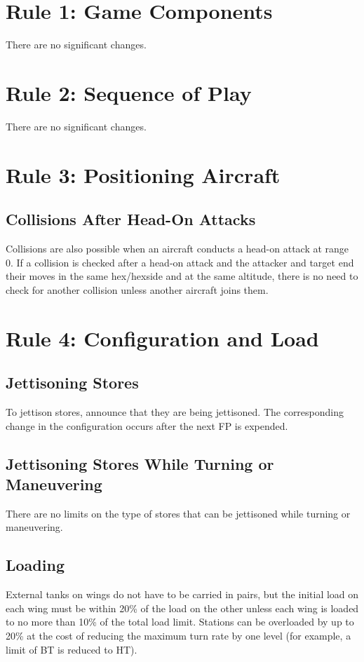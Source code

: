 \documentclass[10pt]{extarticle}
\begin{document}
\section{Rule 1: Game Components}

There are no significant changes.

\section{Rule 2: Sequence of Play}

There are no significant changes.

\section{Rule 3: Positioning Aircraft}

\subsection{Collisions After Head-On Attacks} Collisions are also possible when an aircraft conducts a head-on attack at range 0. If a collision is checked after a head-on attack and the attacker and target end their moves in the same hex/hexside and at the same altitude, there is no need to check for another collision unless another aircraft joins them.

\section{Rule 4: Configuration and Load}

\subsection{Jettisoning Stores} To jettison stores, announce that they are being jettisoned. The corresponding change in the configuration occurs after the next FP is expended. 

\subsection{Jettisoning Stores While Turning or Maneuvering} There are no limits on the type of stores that can be jettisoned while turning or maneuvering.

\subsection{Loading} External tanks on wings do not have to be carried in pairs, but the initial load on each wing must be within 20\% of the load on the other unless each wing is loaded to no more than 10\% of the total load limit. Stations can be overloaded by up to 20\% at the cost of reducing the maximum turn rate by one level (for example, a limit of BT is reduced to HT).
\end{document}

